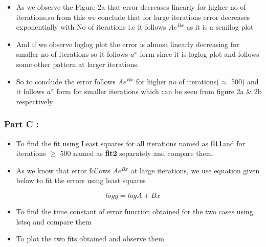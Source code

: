 \documentclass[11pt, a4paper]{article}
\begin{document}
 \begin{itemize}
 \item
   As we observe the Figure 2a that error decreases linearly for higher
   no of iterations,so from this we conclude that for large iterations
   error decreases exponentially with No of iterations i.e it follows
   \(Ae^{Bx}\) as it is a semilog plot
 \item
   And if we observe loglog plot the error is almost linearly decreasing
   for smaller no of iterations so it follows \(a^x\) form since it is
   loglog plot and follows some other pattern at larger iterations.
 \item
   So to conclude the error follows \(Ae^{Bx}\) for higher no of
   iterations(\(\approx\) 500) and it follows \(a^x\) form for smaller
   iterations which can be seen from figure 2a \& 2b respectively
 \end{itemize}
 \newpage

    \subsubsection{Part C :}\label{part-c}

\begin{itemize}
\item
  To find the fit using Least squares for all iterations named as
  \textbf{fit1}and for iterations \(\geq\) 500 named as \textbf{fit2}
  separately and compare them.
\item
  As we know that error follows \(Ae^{Bx}\) at large iterations, we use
  equation given below to fit the errors using least squares
\end{itemize}

\begin{equation}
    logy = logA + Bx
\end{equation}

\begin{itemize}
\item
  To find the time constant of error function obtained for the two cases
  using lstsq and compare them
\item
  To plot the two fits obtained and observe them
\end{itemize}
\end{document}
